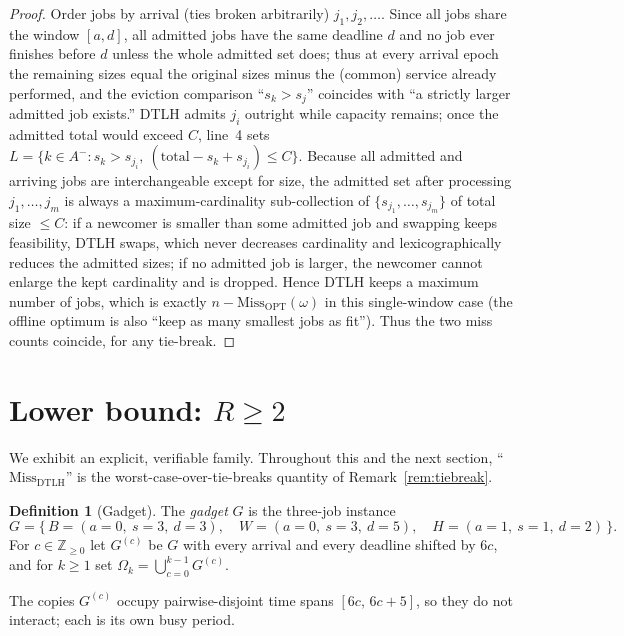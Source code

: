 \documentclass{amsart}
\theoremstyle{definition}
\newtheorem{definition}[theorem]{Definition}
\begin{document}
\begin{proof}
Order jobs by arrival (ties broken arbitrarily) $j_1,j_2,\dots$. Since all jobs
share the window $[a,d]$, all admitted jobs have the same deadline $d$ and no job
ever finishes before $d$ unless the whole admitted set does; thus at every
arrival epoch the remaining sizes equal the original sizes minus the (common)
service already performed, and the eviction comparison ``$s_k>s_j$'' coincides
with ``a strictly larger admitted job exists.'' DTLH admits $j_i$ outright while
capacity remains; once the admitted total would exceed $C$, line~4 sets
$L=\{k\in A^- : s_k>s_{j_i},\ (\text{total}-s_k+s_{j_i})\le C\}$. Because all
admitted and arriving jobs are interchangeable except for size, the admitted set
after processing $j_1,\dots,j_m$ is always a maximum-cardinality sub-collection of
$\{s_{j_1},\dots,s_{j_m}\}$ of total size $\le C$: if a newcomer is smaller than
some admitted job and swapping keeps feasibility, DTLH swaps, which never
decreases cardinality and lexicographically reduces the admitted sizes; if no
admitted job is larger, the newcomer cannot enlarge the kept cardinality and is
dropped. Hence DTLH keeps a maximum number of jobs, which is exactly
$n-\mathrm{Miss}_{\mathrm{OPT}}(\omega)$ in this single-window case (the offline
optimum is also ``keep as many smallest jobs as fit''). Thus the two miss counts
coincide, for any tie-break.
\end{proof}

\section{Lower bound: $R\ge 2$}

We exhibit an explicit, verifiable family. Throughout this and the next section,
``$\mathrm{Miss}_{\mathrm{DTLH}}$'' is the worst-case-over-tie-breaks quantity of
Remark~\ref{rem:tiebreak}.

\begin{definition}[Gadget]\label{def:gadget}
The \emph{gadget} $G$ is the three-job instance
\[
G=\{\,B=(a{=}0,\ s{=}3,\ d{=}3),\quad
      W=(a{=}0,\ s{=}3,\ d{=}5),\quad
      H=(a{=}1,\ s{=}1,\ d{=}2)\,\}.
\]
For $c\in\mathbb{Z}_{\ge 0}$ let $G^{(c)}$ be $G$ with every arrival and every
deadline shifted by $6c$, and for $k\ge 1$ set
$\Omega_k=\bigcup_{c=0}^{k-1}G^{(c)}$.
\end{definition}

The copies $G^{(c)}$ occupy pairwise-disjoint time spans
$[6c,\,6c+5]$, so they do not interact; each is its own busy period.
\end{document}
